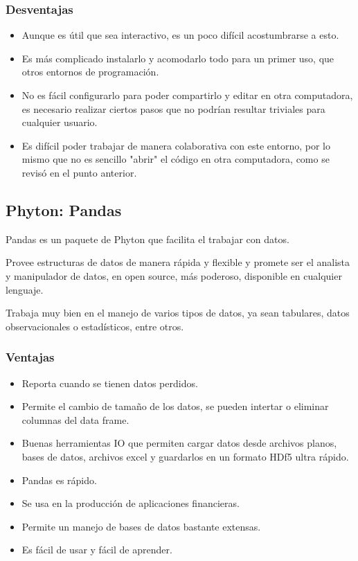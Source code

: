\documentclass{article}
\begin{document}
\subsubsection{Desventajas}
\begin{itemize}
\item Aunque es útil que sea interactivo, es un poco difícil acostumbrarse a esto.
\item Es más complicado instalarlo y acomodarlo todo para un primer uso, que otros entornos de programación. 
\item No es fácil configurarlo para poder compartirlo y editar en otra computadora, es necesario realizar ciertos pasos que no podrían resultar triviales para cualquier usuario.
\item Es difícil poder trabajar de manera colaborativa con este entorno, por lo mismo que no es sencillo "abrir" el código en otra computadora, como se revisó en el punto anterior.
\end{itemize}

\subsection{Phyton: Pandas}

Pandas es un paquete de Phyton que facilita el trabajar con datos. 

Provee estructuras de datos de manera rápida y flexible y promete ser el analista y manipulador de datos, en open source, más poderoso, disponible en cualquier lenguaje. 

Trabaja muy bien en el manejo de varios tipos de datos, ya sean tabulares, datos observacionales o estadísticos, entre otros.

\subsubsection{Ventajas}
\begin{itemize}
\item Reporta cuando se tienen datos perdidos.
\item Permite el cambio de tamaño de los datos, se pueden intertar o eliminar columnas del data frame.
\item Buenas herramientas IO que permiten cargar datos desde archivos planos, bases de datos, archivos excel y guardarlos en un formato HDf5 ultra rápido. 
\item Pandas es rápido.
\item Se usa en la producción de aplicaciones financieras.
\item Permite un manejo de bases de datos bastante extensas.
\item Es fácil de usar y fácil de aprender.
\end{itemize}
\end{document}
